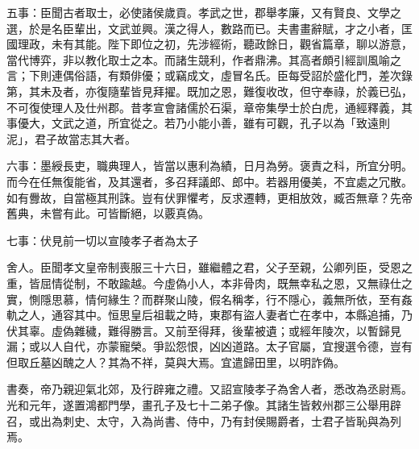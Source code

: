 \begin{pinyinscope}
五事：臣聞古者取士，必使諸侯歲貢。孝武之世，郡舉孝廉，又有賢良、文學之選，於是名臣輩出，文武並興。漢之得人，數路而已。夫書畫辭賦，才之小者，匡國理政，未有其能。陛下即位之初，先涉經術，聽政餘日，觀省篇章，聊以游意，當代博弈，非以教化取士之本。而諸生競利，作者鼎沸。其高者頗引經訓風喻之言；下則連偶俗語，有類俳優；或竊成文，虛冒名氏。臣每受詔於盛化門，差次錄第，其未及者，亦復隨輩皆見拜擢。既加之恩，難復收改，但守奉祿，於義已弘，不可復使理人及仕州郡。昔孝宣會諸儒於石渠，章帝集學士於白虎，通經釋義，其事優大，文武之道，所宜從之。若乃小能小善，雖有可觀，孔子以為「致遠則泥」，君子故當志其大者。

六事：墨綬長吏，職典理人，皆當以惠利為績，日月為勞。褒責之科，所宜分明。而今在任無復能省，及其還者，多召拜議郎、郎中。若器用優美，不宜處之冗散。如有釁故，自當極其刑誅。豈有伏罪懼考，反求遷轉，更相放效，臧否無章？先帝舊典，未嘗有此。可皆斷絕，以覈真偽。

七事：伏見前一切以宣陵孝子者為太子

舍人。臣聞孝文皇帝制喪服三十六日，雖繼體之君，父子至親，公卿列臣，受恩之重，皆屈情從制，不敢踰越。今虛偽小人，本非骨肉，既無幸私之恩，又無祿仕之實，惻隱思慕，情何緣生？而群聚山陵，假名稱孝，行不隱心，義無所依，至有姦軌之人，通容其中。恒思皇后祖載之時，東郡有盜人妻者亡在孝中，本縣追捕，乃伏其辜。虛偽雜穢，難得勝言。又前至得拜，後輩被遺；或經年陵次，以暫歸見漏；或以人自代，亦蒙寵榮。爭訟怨恨，凶凶道路。太子官屬，宜搜選令德，豈有但取丘墓凶醜之人？其為不祥，莫與大焉。宜遣歸田里，以明詐偽。

書奏，帝乃親迎氣北郊，及行辟雍之禮。又詔宣陵孝子為舍人者，悉改為丞尉焉。光和元年，遂置鴻都門學，畫孔子及七十二弟子像。其諸生皆敕州郡三公舉用辟召，或出為刺史、太守，入為尚書、侍中，乃有封侯賜爵者，士君子皆恥與為列焉。


\end{pinyinscope}

